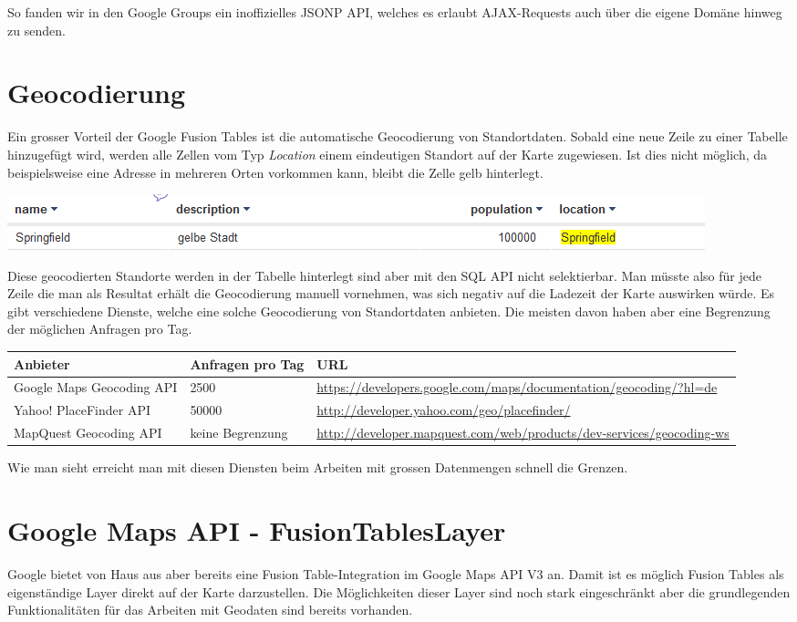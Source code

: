 So fanden wir in den Google Groups ein inoffizielles JSONP API, welches es erlaubt AJAX-Requests auch über die eigene Domäne hinweg zu senden.

\section{Geocodierung}
Ein grosser Vorteil der Google Fusion Tables ist die automatische 
\gls{Geocodierung} von Standortdaten. Sobald eine neue Zeile zu einer Tabelle hinzugefügt wird, werden alle Zellen vom Typ \emph{Location} einem eindeutigen Standort auf der Karte zugewiesen. Ist dies nicht möglich, da beispielsweise eine Adresse in mehreren Orten vorkommen kann, bleibt die Zelle gelb hinterlegt.
 
\includegraphics[scale=0.75]{images/geocoding_failed.png}

Diese geocodierten Standorte werden in der Tabelle hinterlegt sind aber mit den SQL API nicht selektierbar. Man müsste also für jede Zeile die man als Resultat erhält die Geocodierung manuell vornehmen, was sich negativ auf die Ladezeit der Karte auswirken würde.
Es gibt verschiedene Dienste, welche eine solche Geocodierung von Standortdaten anbieten. Die meisten davon haben aber eine Begrenzung der möglichen Anfragen pro Tag.

\begin{tabular}{|l|p{1.9cm}|p{7.3cm}|}
\hline 
Anbieter & Anfragen pro Tag & URL \\ 
\hline 
Google Maps Geocoding API & 2500 & \url{https://developers.google.com/maps/documentation/geocoding/?hl=de} \\ 
\hline 
Yahoo! PlaceFinder API & 50000 & \url{http://developer.yahoo.com/geo/placefinder/} \\ 
\hline 
MapQuest Geocoding API & keine Begrenzung & \url{http://developer.mapquest.com/web/products/dev-services/geocoding-ws} \\ 
\hline 
\end{tabular} 

Wie man sieht erreicht man mit diesen Diensten beim Arbeiten mit grossen Datenmengen schnell die Grenzen.

\section{Google Maps API - FusionTablesLayer}
Google bietet von Haus aus aber bereits eine Fusion Table-Integration im Google Maps API V3 an. Damit ist es möglich Fusion Tables als eigenständige Layer direkt auf der Karte darzustellen.
Die Möglichkeiten dieser Layer sind noch stark eingeschränkt aber die grundlegenden Funktionalitäten für das Arbeiten mit Geodaten sind bereits vorhanden.

